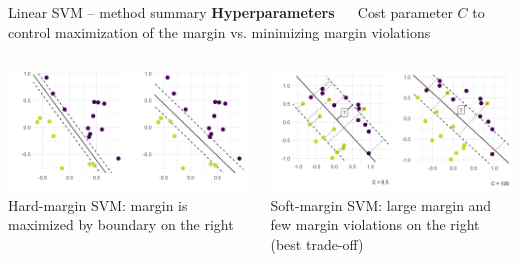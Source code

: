 \documentclass[11pt,compress,t,notes=noshow, xcolor=table]{beamer}
\newcommand{\highlight}[1]{\textcolor{hlcol}{\textbf{#1}}}
\begin{document}
\begin{frame2}{Linear SVM -- method summary}
\highlight{Hyperparameters} ~~ Cost parameter \textbf{$C$} to control maximization of the margin vs. minimizing margin violations

\hfill
\begin{columns}
  \begin{column}{0.5\textwidth}
  \centering
      \includegraphics[width=\textwidth]{
figure/linear_classif_2.png}  \\
\tiny{Hard-margin SVM: margin is maximized by boundary on the right}
  \end{column}
  \begin{column}{0.5\textwidth}
  \centering
\includegraphics[width=\textwidth]{
figure/margin_violations.png}  \\
\tiny{Soft-margin SVM: large margin and few margin violations on the right (best trade-off)}
  \end{column}
\end{columns}

\normalsize

\end{frame2}
\end{document}
